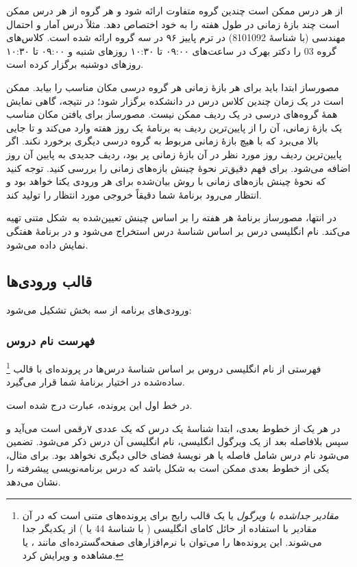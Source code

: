\documentclass{utap}
\begin{document}
    از هر درس ممکن است چندین گروه متفاوت ارائه شود و هر گروه از هر درس ممکن است چند بازهٔ زمانی در طول هفته را به خود اختصاص دهد. مثلاً درس آمار و احتمال مهندسی (با شناسهٔ 8101092) در ترم پاییز ۹۶ در سه گروه ارائه شده است. کلاس‌های گروه 03 را دکتر بهرک در ساعت‌های ۰۹:۰۰ تا ۱۰:۳۰ روزهای شنبه و ۰۹:۰۰ تا ۱۰:۳۰ روزهای دوشنبه برگزار کرده است.

    مصورساز ابتدا باید برای هر بازهٔ زمانی هر گروه درسی مکان مناسب را بیابد. ممکن است در یک زمان چندین کلاس درس در دانشکده برگزار شود؛ در نتیجه، گاهی نمایش همهٔ گروه‌های درسی در یک ردیف ممکن نیست. مصورساز برای یافتن مکان مناسب یک بازهٔ زمانی، آن را از پایین‌ترین ردیف به برنامهٔ یک روز هفته وارد می‌کند و تا جایی بالا می‌برد که با هیچ بازهٔ زمانی مربوط به گروه درسی دیگری برخورد نکند. اگر پایین‌ترین ردیف روز مورد نظر در آن بازهٔ زمانی پر بود، ردیف جدیدی به پایین آن روز اضافه می‌شود. برای فهم دقیق‌تر نحوهٔ چینش بازه‌‌های زمانی  را بررسی کنید. توجه کنید که نحوهٔ چینش بازه‌های زمانی با روش بیان‌شده برای هر ورودی یکتا خواهد بود و انتظار می‌رود برنامهٔ شما دقیقاً خروجی مورد انتظار را تولید کند.

    در انتها، مصورساز برنامهٔ هر هفته را بر اساس چینش تعیین‌شده به~شکل متنی تهیه می‌کند. نام انگلیسی درس بر اساس شناسهٔ درس استخراج می‌شود و در برنامهٔ هفتگی نمایش داده می‌شود.

    \subsection{قالب ورودی‌ها}

    ورودی‌های برنامه از سه بخش تشکیل می‌شود:

    \subsubsection{فهرست نام دروس}

    فهرستی از نام انگلیسی دروس بر اساس شناسهٔ  درس‌ها در پرونده‌ای با قالب \footnote{\textit{مقادیر جداشده با ویرگول} یا  یک قالب رایج برای پرونده‌های متنی است که در آن مقادیر با استفاده از حائل کامای انگلیسی (\lr{\texttt{,}} با شناسهٔ  44 یا ) از یکدیگر جدا می‌شوند. این پرونده‌ها را می‌توان با نرم‌افزارهای صفحه‌گسترده‌ای مانند ،  یا  مشاهده و ویرایش کرد.} ساده‌شده در اختیار برنامهٔ شما قرار می‌گیرد.

    در خط اول این پرونده، عبارت  درج شده است.

    در هر یک از خطوط بعدی، ابتدا شناسهٔ یک درس که یک عددی ۷‌رقمی است می‌آید و سپس بلافاصله بعد از یک ویرگول انگلیسی، نام انگلیسی آن درس ذکر می‌شود. تضمین می‌شود نام درس شامل فاصله یا هر نویسهٔ فضای خالی دیگری نخواهد بود. برای مثال، یکی از خطوط بعدی ممکن است به شکل  باشد که درس برنامه‌نویسی پیشرفته را نشان می‌دهد.
\end{document}
